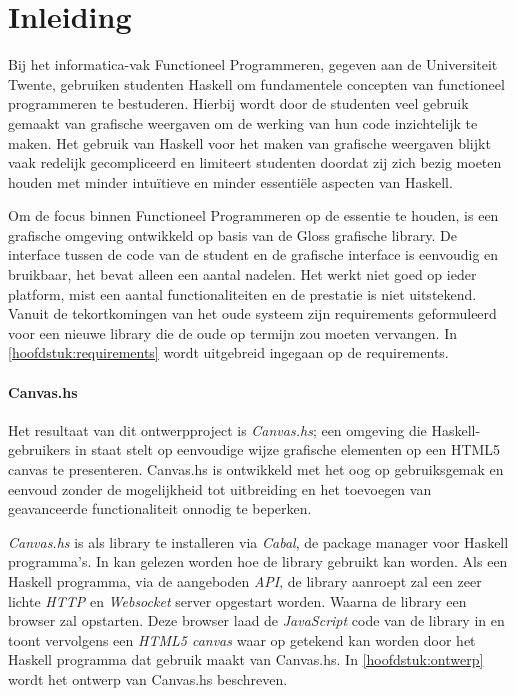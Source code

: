 \chapter{Inleiding}
Bij het informatica-vak Functioneel Programmeren, gegeven aan de Universiteit Twente, gebruiken studenten Haskell om fundamentele concepten van functioneel programmeren te bestuderen. Hierbij wordt door de studenten veel gebruik gemaakt van grafische weergaven om de werking van hun code inzichtelijk te maken. Het gebruik van Haskell voor het maken van grafische weergaven blijkt vaak redelijk gecompliceerd en limiteert studenten doordat zij zich bezig moeten houden met minder intuïtieve en minder essentiële aspecten van Haskell.

Om de focus binnen Functioneel Programmeren op de essentie te houden, is een grafische omgeving ontwikkeld op basis van de Gloss grafische library. De interface tussen de code van de student en de grafische interface is eenvoudig en bruikbaar, het bevat alleen een aantal nadelen. Het werkt niet goed op ieder platform, mist een aantal functionaliteiten en de prestatie is niet uitstekend. Vanuit de tekortkomingen van het oude systeem zijn requirements geformuleerd voor een nieuwe library die de oude op termijn zou moeten vervangen. In \autoref{hoofdstuk:requirements} wordt uitgebreid ingegaan op de requirements.

\subsubsection{Canvas.hs}
Het resultaat van dit ontwerpproject is \emph{Canvas.hs}; een omgeving die Haskell-gebruikers in staat stelt op eenvoudige wijze grafische elementen op een HTML5 canvas te presenteren. Canvas.hs is ontwikkeld met het oog op gebruiksgemak en eenvoud zonder de mogelijkheid tot uitbreiding en het toevoegen van geavanceerde functionaliteit onnodig te beperken.

\emph{Canvas.hs} is als library te installeren via \emph{Cabal}, de package manager voor Haskell programma's. In  kan gelezen worden hoe de library gebruikt kan worden. Als een Haskell programma, via de aangeboden \emph{API}, de library aanroept zal een zeer lichte \emph{HTTP} en \emph{Websocket} server opgestart worden. Waarna de library een browser zal opstarten. Deze browser laad de \emph{JavaScript} code van de library in en toont vervolgens een \emph{HTML5 canvas} waar op getekend kan worden door het Haskell programma dat gebruik maakt van Canvas.hs. In \autoref{hoofdstuk:ontwerp} wordt het ontwerp van Canvas.hs beschreven.

